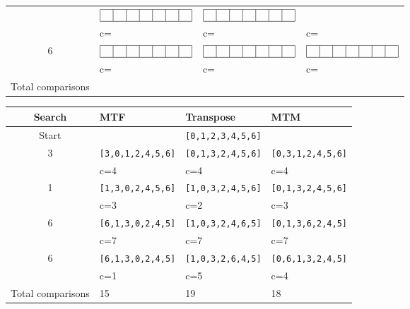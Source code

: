 \begin{enumerate}
\begin{spaceForAnswer}
\begin{tabular}{|c|p{3.2cm}|p{3.2cm}|p{3.2cm}|}
&$\begin{array}{|c|c|c|c|c|c|c|}\hline\ &\ &\ &\ &\ &\ &\ \\ \hline\end{array}$
&$\begin{array}{|c|c|c|c|c|c|c|}\hline\ &\ &\ &\ &\ &\ &\ \\ \hline\end{array}$
\\
&
c= \hspace{.5cm} &
c= \hspace{.5cm} &
c= \hspace{.5cm} \\
\hline
6
&$\begin{array}{|c|c|c|c|c|c|c|}\hline\ &\ &\ &\ &\ &\ &\ \\ \hline\end{array}$
&$\begin{array}{|c|c|c|c|c|c|c|}\hline\ &\ &\ &\ &\ &\ &\ \\ \hline\end{array}$
&$\begin{array}{|c|c|c|c|c|c|c|}\hline\ &\ &\ &\ &\ &\ &\ \\ \hline\end{array}$
\\
&
c= \hspace{.5cm} &
c= \hspace{.5cm} &
c= \hspace{.5cm} \\
\hline
\hline
Total comparisons&
  &  &  \\
\hline
\end{tabular}
\end{spaceForAnswer}
\begin{solution}
\begin{tabular}{|c|l|l|l|}
\hline
Search & MTF & Transpose & MTM\\
\hline
\hline
Start&
\multicolumn{3}{|c|}{\tt [0,1,2,3,4,5,6]}\\
\hline
\hline
3&
{\tt [3,0,1,2,4,5,6]}&
{\tt [0,1,3,2,4,5,6]}&
{\tt [0,3,1,2,4,5,6]}\\
&
c=4&
c=4&
c=4\\
\hline
1&
{\tt [1,3,0,2,4,5,6]}&
{\tt [1,0,3,2,4,5,6]}&
{\tt [0,1,3,2,4,5,6]}\\
&
c=3&
c=2&
c=3\\
\hline
6&
{\tt [6,1,3,0,2,4,5]}&
{\tt [1,0,3,2,4,6,5]}&
{\tt [0,1,3,6,2,4,5]}\\
&
c=7&
c=7&
c=7\\
\hline
6&
{\tt [6,1,3,0,2,4,5]}&
{\tt [1,0,3,2,6,4,5]}&
{\tt [0,6,1,3,2,4,5]}\\
&
c=1&
c=5&
c=4\\
\hline
\hline
Total comparisons&
15&19&18\\
\hline
\end{tabular}


\end{solution}
\end{enumerate}

